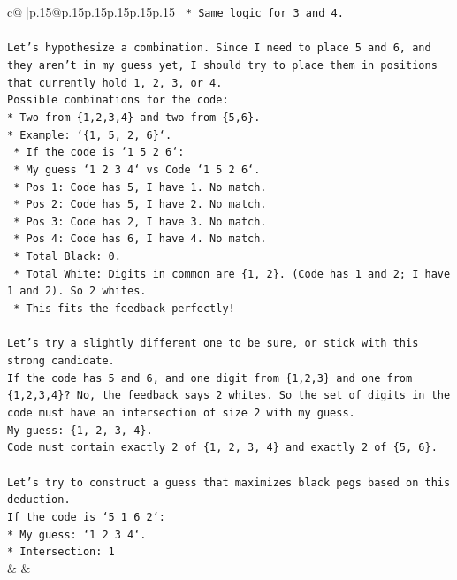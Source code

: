 \documentclass{article}
\begin{document}
{\begin{supertabular}{c@{$\;$}|p{.15\linewidth}@{}p{.15\linewidth}p{.15\linewidth}p{.15\linewidth}p{.15\linewidth}p{.15\linewidth}}
{{{\texttt{    *   Same logic for 3 and 4.} \\
\\ 
\texttt{Let's hypothesize a combination. Since I need to place 5 and 6, and they aren't in my guess yet, I should try to place them in positions that currently hold 1, 2, 3, or 4.} \\
\texttt{Possible combinations for the code:} \\
\texttt{*   Two from \{1,2,3,4\} and two from \{5,6\}.} \\
\texttt{*   Example: `\{1, 5, 2, 6\}`.} \\
\texttt{    *   If the code is `1 5 2 6`:} \\
\texttt{        *   My guess `1 2 3 4` vs Code `1 5 2 6`.} \\
\texttt{        *   Pos 1: Code has 5, I have 1. No match.} \\
\texttt{        *   Pos 2: Code has 5, I have 2. No match.} \\
\texttt{        *   Pos 3: Code has 2, I have 3. No match.} \\
\texttt{        *   Pos 4: Code has 6, I have 4. No match.} \\
\texttt{        *   Total Black: 0.} \\
\texttt{        *   Total White: Digits in common are \{1, 2\}. (Code has 1 and 2; I have 1 and 2). So 2 whites.} \\
\texttt{        *   This fits the feedback perfectly!} \\
\\ 
\texttt{Let's try a slightly different one to be sure, or stick with this strong candidate.} \\
\texttt{If the code has 5 and 6, and one digit from \{1,2,3\} and one from \{1,2,3,4\}? No, the feedback says 2 whites. So the set of digits in the code must have an intersection of size 2 with my guess.} \\
\texttt{My guess: \{1, 2, 3, 4\}.} \\
\texttt{Code must contain exactly 2 of \{1, 2, 3, 4\} and exactly 2 of \{5, 6\}.} \\
\\ 
\texttt{Let's try to construct a guess that maximizes black pegs based on this deduction.} \\
\texttt{If the code is `5 1 6 2`:} \\
\texttt{*   My guess: `1 2 3 4`.} \\
\texttt{*   Intersection: 1} \\
            }
        }
    }
    & & \\ \\


\end{supertabular}}
\end{document}
